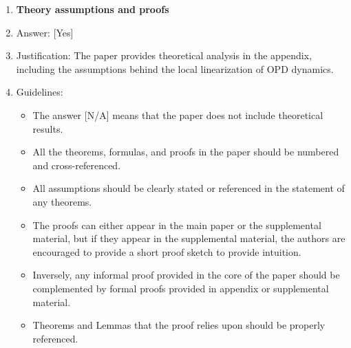 \documentclass{llmxive}
\providecommand{\answerYes}[1][]{[Yes]#1}
\providecommand{\answerNA}[1][]{[N/A]#1}
\begin{document}
\begin{enumerate}
\item {\bf Theory assumptions and proofs}
    \item[] Answer: \answerYes{}
    \item[] Justification: The paper provides theoretical analysis in the appendix, including the assumptions behind the local linearization of OPD dynamics.
    \item[] Guidelines:
    \begin{itemize}
        \item The answer \answerNA{} means that the paper does not include theoretical results. 
        \item All the theorems, formulas, and proofs in the paper should be numbered and cross-referenced.
        \item All assumptions should be clearly stated or referenced in the statement of any theorems.
        \item The proofs can either appear in the main paper or the supplemental material, but if they appear in the supplemental material, the authors are encouraged to provide a short proof sketch to provide intuition. 
        \item Inversely, any informal proof provided in the core of the paper should be complemented by formal proofs provided in appendix or supplemental material.
        \item Theorems and Lemmas that the proof relies upon should be properly referenced. 
    \end{itemize}



\end{enumerate}
\end{document}
